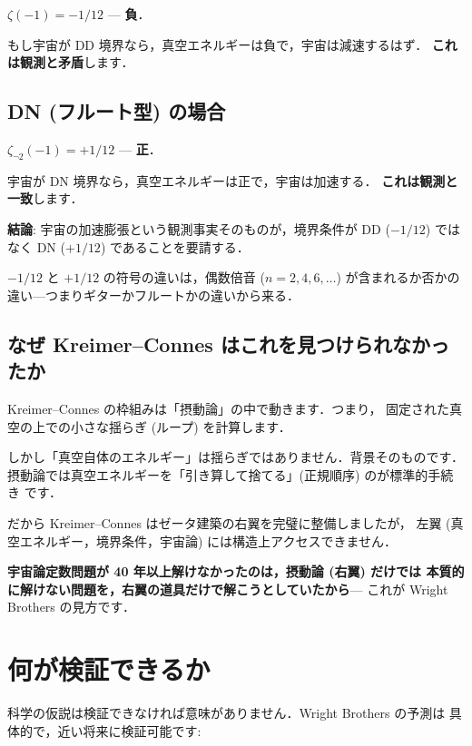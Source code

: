 \documentclass[11pt,a4paper]{article}
\begin{document}
$\zeta(-1) = -1/12$ --- \textbf{負}．

もし宇宙が DD 境界なら，真空エネルギーは負で，宇宙は減速するはず．
\textbf{これは観測と矛盾}します．

\subsection{DN (フルート型) の場合}

$\zeta_{\neg 2}(-1) = +1/12$ --- \textbf{正}．

宇宙が DN 境界なら，真空エネルギーは正で，宇宙は加速する．
\textbf{これは観測と一致}します．

\begin{tcolorbox}[colback=blue!5,colframe=blue!50!black]
\textbf{結論}: 宇宙の加速膨張という観測事実そのものが，境界条件が
DD ($-1/12$) ではなく DN ($+1/12$) であることを要請する．

$-1/12$ と $+1/12$ の符号の違いは，偶数倍音 ($n = 2, 4, 6, \ldots$)
が含まれるか否かの違い---つまりギターかフルートかの違いから来る．
\end{tcolorbox}

\subsection{なぜ Kreimer--Connes はこれを見つけられなかったか}

Kreimer--Connes の枠組みは「摂動論」の中で動きます．つまり，
固定された真空の上での小さな揺らぎ (ループ) を計算します．

しかし「真空自体のエネルギー」は揺らぎではありません．背景そのものです．
摂動論では真空エネルギーを「引き算して捨てる」(正規順序) のが標準的手続き
です．

だから Kreimer--Connes はゼータ建築の右翼を完璧に整備しましたが，
左翼 (真空エネルギー，境界条件，宇宙論) には構造上アクセスできません．

\textbf{宇宙論定数問題が 40 年以上解けなかったのは，摂動論 (右翼) だけでは
本質的に解けない問題を，右翼の道具だけで解こうとしていたから}---
これが Wright Brothers の見方です．

\section{何が検証できるか}

科学の仮説は検証できなければ意味がありません．Wright Brothers の予測は
具体的で，近い将来に検証可能です:
\end{document}
